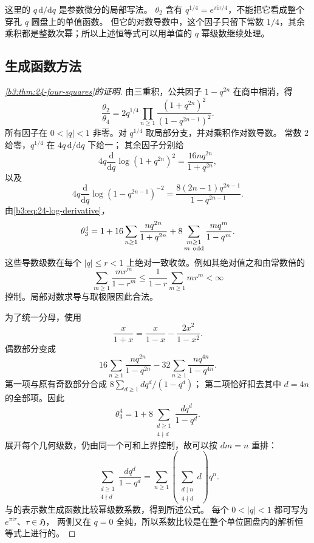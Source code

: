 这里的 \(q\,\mathrm d/\mathrm dq\) 是参数微分的局部写法。
\(\theta_2\) 含有 \(q^{1/4}=e^{\pi\mathrm{i}\tau/4}\)，不能把它看成整个穿孔 \(q\) 圆盘上的单值函数。
但它的对数导数中，这个因子只留下常数 \(1/4\)，其余乘积都是整数次幂；所以上述恒等式可以用单值的 \(q\) 幂级数继续处理。

\subsection{生成函数方法}
\label{b3:subsec:240404}

\begin{proof}[\cref{b3:thm:24-four-squares}的证明]
由三重积，公共因子 \(1-q^{2n}\) 在商中相消，得
\[
\frac{\theta_2}{\theta_4}
=2q^{1/4}\prod_{n\ge1}
       \frac{(1+q^{2n})^2}{(1-q^{2n-1})^2}.
\]
所有因子在 \(0<|q|<1\) 非零。对 \(q^{1/4}\) 取局部分支，并对乘积作对数导数。
常数 \(2\) 给零，\(q^{1/4}\) 在 \(4q\,\mathrm d/\mathrm dq\) 下给一；
其余因子分别给
\[
4q\frac{\mathrm d}{\mathrm dq}\log(1+q^{2n})^2
=\frac{16nq^{2n}}{1+q^{2n}},
\]
以及
\[
4q\frac{\mathrm d}{\mathrm dq}\log(1-q^{2n-1})^{-2}
=\frac{8(2n-1)q^{2n-1}}{1-q^{2n-1}}.
\]
由\eqref{b3:eq:24-log-derivative}，
\[
\theta_3^4
=1+16\sum_{n\ge1}\frac{nq^{2n}}{1+q^{2n}}
 +8\sum_{\substack{m\ge1\\m\ {\rm odd}}}\frac{mq^m}{1-q^m}.
\]
这些导数级数在每个 \(|q|\le r<1\) 上绝对一致收敛。例如其绝对值之和由常数倍的
\[
\sum_{m\ge1}\frac{mr^m}{1-r^m}
\le\frac1{1-r}\sum_{m\ge1}mr^m<\infty
\]
控制。局部对数求导与取极限因此合法。

为了统一分母，使用
\[
\frac{x}{1+x}=\frac{x}{1-x}-\frac{2x^2}{1-x^2}.
\]
偶数部分变成
\[
16\sum_{n\ge1}\frac{nq^{2n}}{1-q^{2n}}
-32\sum_{n\ge1}\frac{nq^{4n}}{1-q^{4n}}.
\]
第一项与原有奇数部分合成 \(8\sum_{d\ge1}dq^d/(1-q^d)\)；
第二项恰好扣去其中 \(d=4n\) 的全部项。因此
\begin{equation}\label{b3:eq:24-four-square-lambert}
\theta_3^4
=1+8\sum_{\substack{d\ge1\\4\nmid d}}\frac{dq^d}{1-q^d}.
\end{equation}
展开每个几何级数，仍由同一个可和上界控制，故可以按 \(dm=n\) 重排：
\[
\sum_{\substack{d\ge1\\4\nmid d}}\frac{dq^d}{1-q^d}
=\sum_{n\ge1}\left(\sum_{\substack{d\mid n\\4\nmid d}}d\right)q^n.
\]
与的表示数生成函数比较幂级数系数，得到所述公式。
每个 \(0<|q|<1\) 都可写为 \(e^{\pi\mathrm{i}\tau}\)、\(\tau\in\mathfrak H\)，
两侧又在 \(q=0\) 全纯，所以系数比较是在整个单位圆盘内的解析恒等式上进行的。
\end{proof}

